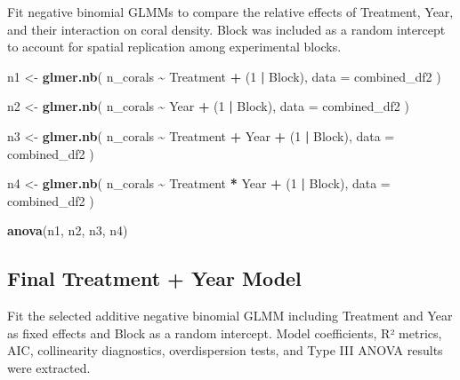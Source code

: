 \documentclass[
]{article}
\newenvironment{Shaded}{\begin{snugshade}}{\end{snugshade}}
\newcommand{\AttributeTok}[1]{\textcolor[rgb]{0.13,0.29,0.53}{#1}}
\newcommand{\DecValTok}[1]{\textcolor[rgb]{0.00,0.00,0.81}{#1}}
\newcommand{\FunctionTok}[1]{\textcolor[rgb]{0.13,0.29,0.53}{\textbf{#1}}}
\newcommand{\NormalTok}[1]{#1}
\newcommand{\OtherTok}[1]{\textcolor[rgb]{0.56,0.35,0.01}{#1}}
\newcommand{\SpecialCharTok}[1]{\textcolor[rgb]{0.81,0.36,0.00}{\textbf{#1}}}
\begin{document}
Fit negative binomial GLMMs to compare the relative effects of
Treatment, Year, and their interaction on coral density. Block was
included as a random intercept to account for spatial replication among
experimental blocks.

\begin{Shaded}
\begin{Highlighting}[]
\NormalTok{n1 }\OtherTok{\textless{}{-}} \FunctionTok{glmer.nb}\NormalTok{(}
\NormalTok{  n\_corals }\SpecialCharTok{\textasciitilde{}}\NormalTok{ Treatment }\SpecialCharTok{+}\NormalTok{ (}\DecValTok{1} \SpecialCharTok{|}\NormalTok{ Block),}
  \AttributeTok{data =}\NormalTok{ combined\_df2}
\NormalTok{)}

\NormalTok{n2 }\OtherTok{\textless{}{-}} \FunctionTok{glmer.nb}\NormalTok{(}
\NormalTok{  n\_corals }\SpecialCharTok{\textasciitilde{}}\NormalTok{ Year }\SpecialCharTok{+}\NormalTok{ (}\DecValTok{1} \SpecialCharTok{|}\NormalTok{ Block),}
  \AttributeTok{data =}\NormalTok{ combined\_df2}
\NormalTok{)}

\NormalTok{n3 }\OtherTok{\textless{}{-}} \FunctionTok{glmer.nb}\NormalTok{(}
\NormalTok{  n\_corals }\SpecialCharTok{\textasciitilde{}}\NormalTok{ Treatment }\SpecialCharTok{+}\NormalTok{ Year }\SpecialCharTok{+}\NormalTok{ (}\DecValTok{1} \SpecialCharTok{|}\NormalTok{ Block),}
  \AttributeTok{data =}\NormalTok{ combined\_df2}
\NormalTok{)}

\NormalTok{n4 }\OtherTok{\textless{}{-}} \FunctionTok{glmer.nb}\NormalTok{(}
\NormalTok{  n\_corals }\SpecialCharTok{\textasciitilde{}}\NormalTok{ Treatment }\SpecialCharTok{*}\NormalTok{ Year }\SpecialCharTok{+}\NormalTok{ (}\DecValTok{1} \SpecialCharTok{|}\NormalTok{ Block),}
  \AttributeTok{data =}\NormalTok{ combined\_df2}
\NormalTok{)}

\FunctionTok{anova}\NormalTok{(n1, n2, n3, n4)}
\end{Highlighting}
\end{Shaded}

\subsection{Final Treatment + Year
Model}\label{final-treatment-year-model-1}

Fit the selected additive negative binomial GLMM including Treatment and
Year as fixed effects and Block as a random intercept. Model
coefficients, R² metrics, AIC, collinearity diagnostics, overdispersion
tests, and Type III ANOVA results were extracted.
\end{document}

